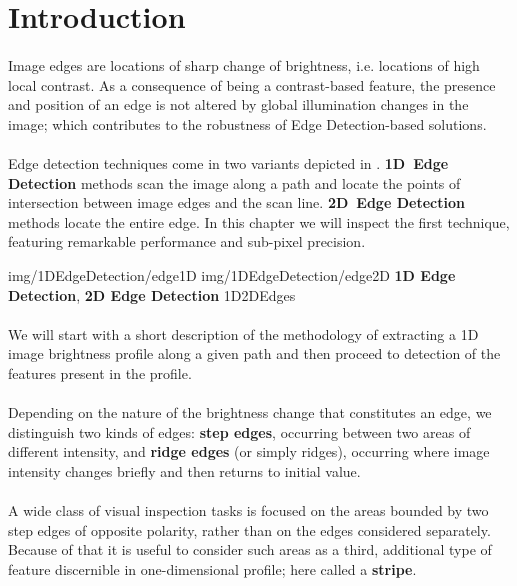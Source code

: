 \section{Introduction}
\paragraph*{}
Image edges are locations of sharp change of brightness, i.e. locations of high local contrast. As a consequence of being a contrast-based feature, the presence and position of an edge is not altered by global illumination changes in the image; which contributes to the robustness of Edge Detection-based solutions.

\paragraph*{}
Edge detection techniques come in two variants depicted in . \textbf{1D~Edge Detection} methods scan the image along a path and locate the points of intersection between image edges and the scan line. \textbf{2D~Edge Detection} methods locate the entire edge. In this chapter we will inspect the first technique, featuring remarkable performance and sub-pixel precision.

\twoFigures
{img/1DEdgeDetection/edge1D}
{img/1DEdgeDetection/edge2D}
{\textbf{1D Edge Detection}, \textbf{2D Edge Detection}}
{1D2DEdges}
{\basicWidth}

\paragraph*{}
We will start with a short description of the methodology of extracting a 1D image brightness profile along a given path and then proceed to detection of the features present in the profile.

\paragraph*{}
Depending on the nature of the brightness change that constitutes an edge, we distinguish two kinds of edges: \textbf{step edges}, occurring between two areas of different intensity, and \textbf{ridge edges} (or simply ridges), occurring where image intensity changes briefly and then returns to initial value.

\paragraph*{}
A wide class of visual inspection tasks is focused on the areas bounded by two step edges of opposite polarity, rather than on the edges considered separately. Because of that it is useful to consider such areas as a third, additional type of feature discernible in one-dimensional profile; here called a \textbf{stripe}.  

